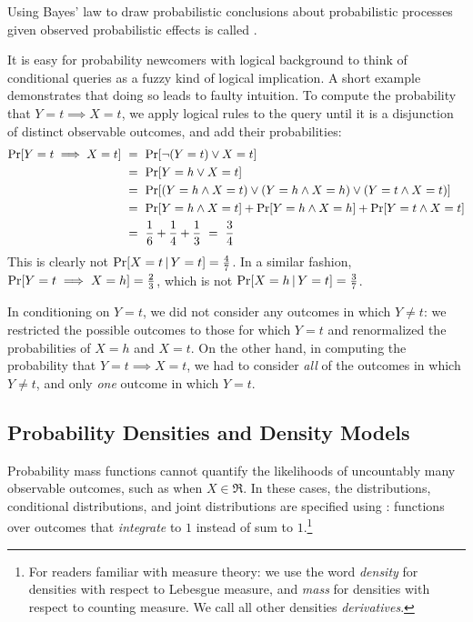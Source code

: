 Using Bayes' law to draw probabilistic conclusions about probabilistic processes given observed probabilistic effects is called .

It is easy for probability newcomers with logical background to think of conditional queries as a fuzzy kind of logical implication.
A short example demonstrates that doing so leads to faulty intuition.
To compute the probability that $Y = t \implies X = t$, we apply logical rules to the query until it is a disjunction of distinct observable outcomes, and add their probabilities:
\begin{equation}
\begin{aligned}
	\mathrm{Pr}\!\left[{Y = t \implies X = t}\right]
	&\ =\ \mathrm{Pr}\!\left[{\neg (Y = t) \vee X = t}\right]
\\
	&\ =\ \mathrm{Pr}\!\left[{Y = h \vee X = t}\right]
\\
	&\ =\ \mathrm{Pr}\!\left[{(Y = h \wedge X = t) \vee (Y = h \wedge X = h) \vee (Y = t \wedge X = t)}\right]
\\
	&\ =\ \mathrm{Pr}\!\left[{Y = h \wedge X = t}\right] + \mathrm{Pr}\!\left[{Y = h \wedge X = h}\right] + \mathrm{Pr}\!\left[{Y = t \wedge X = t}\right]
\\
	&\ =\ \frac{1}{6} + \frac{1}{4} + \frac{1}{3} \ =\ \frac{3}{4}
\end{aligned}
\end{equation}
This is clearly not $\mathrm{Pr}\!\left[{X = t \,|\, Y = t}\right] = \frac{4}{7}$.
In a similar fashion, $\mathrm{Pr}\!\left[{Y = t \implies X = h}\right] = \frac{2}{3}$, which is not $\mathrm{Pr}\!\left[{X = h \,|\, Y = t}\right] = \frac{3}{7}$.

In conditioning on $Y = t$, we did not consider any outcomes in which $Y \neq t$: we restricted the possible outcomes to those for which $Y = t$ and renormalized the probabilities of $X = h$ and $X = t$.
On the other hand, in computing the probability that $Y = t \implies X = t$, we had to consider \emph{all} of the outcomes in which $Y \neq t$, and only \emph{one} outcome in which $Y = t$.


\subsection{Probability Densities and Density Models}

Probability mass functions cannot quantify the likelihoods of uncountably many observable outcomes, such as when $X \in \Re$.
In these cases, the distributions, conditional distributions, and joint distributions are specified using : functions over outcomes that \emph{integrate} to $1$ instead of sum to $1$.\footnote{For readers familiar with measure theory: we use the word \emph{density} for densities with respect to Lebesgue measure, and \emph{mass} for densities with respect to counting measure. We call all other densities \emph{derivatives}.}

